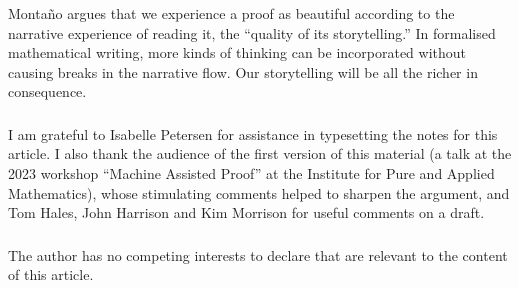 \documentclass[runningheads]{llncs}
\begin{document}
Monta\~no \cite{Mon12} argues that we experience a proof as beautiful according to the narrative experience of reading it,
the ``quality of its storytelling.''
In formalised mathematical writing,
more kinds of thinking can be incorporated without causing breaks in the narrative flow.
Our storytelling will be all the richer in consequence.

\begin{credits}
  \subsubsection{\ackname} I am grateful to Isabelle Petersen for assistance in typesetting the notes for this article.
  I also thank the audience of the first version of this material
  (a talk at the 2023 workshop ``Machine Assisted Proof'' at the Institute for Pure and Applied Mathematics),
  whose stimulating comments helped to sharpen the argument,
  and Tom Hales, John Harrison and Kim Morrison for useful comments on a draft.
  
  \subsubsection{\discintname}
  The author has no competing interests to declare that are
  relevant to the content of this article.
\end{credits}



\end{document}
